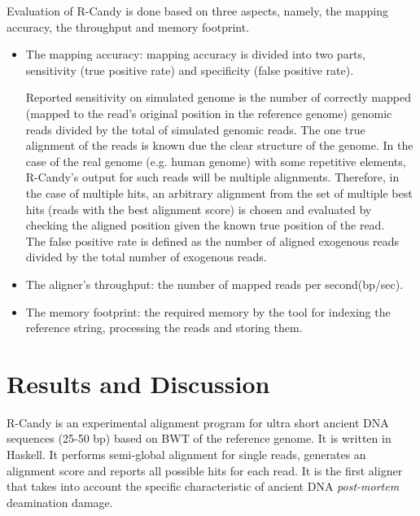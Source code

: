 \documentclass[11pt,a4paper]{report}
\begin{document}
Evaluation of R-Candy is done based on three aspects, namely, 
the mapping accuracy, the throughput and memory footprint.

\begin{itemize}

 \item The mapping accuracy: mapping accuracy is divided into two parts, 
 sensitivity (true positive rate) and specificity (false positive rate).

Reported sensitivity on simulated genome is the number of correctly mapped
(mapped to the read's original position in the reference genome) 
genomic reads divided by the total of simulated genomic reads.
The one true alignment of the reads is known due the clear structure of the genome.
In the case of the real 
genome (e.g. human genome) with some repetitive elements, R-Candy's output
for such reads will be multiple alignments. Therefore, in the case of multiple 
hits, an arbitrary alignment from the set of multiple best hits (reads with 
the best alignment score) is chosen and evaluated by checking the aligned 
position given the known true position of the read.\\

The false positive rate is defined as the number of aligned exogenous reads 
divided by the total number of exogenous reads.

 \item The aligner's throughput: the number of mapped reads per second(bp/sec).

 \item The memory footprint: the required memory by the tool for indexing 
the reference string, processing the reads and storing them. 

\end{itemize}
 



\section{Results and Discussion} \label{Results and Discussion}

R-Candy is an experimental alignment program for ultra short ancient DNA sequences 
(25-50 bp) based on BWT of the reference genome. It is written in Haskell. 
It performs semi-global alignment for single reads, 
generates an alignment score and reports all possible hits for each read.
It is the first aligner that takes into account the specific characteristic
of ancient DNA \emph{post-mortem} deamination damage.
\end{document}
